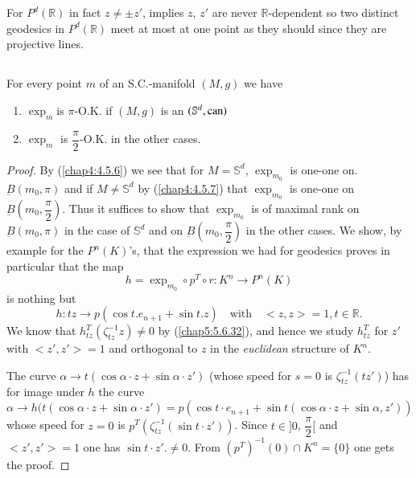 \begin{remark*}
For $P^{d}(\mathbb{R})$ in fact $z\neq \pm z'$, implies $z$, $z'$ are
never $\mathbb{R}$-dependent so two distinct geodesics in
$P^{d}(\mathbb{R})$ meet at most at one point as they should since
they are projective lines.
\end{remark*}

\setcounter{subsection}{11}
\subsection{}\label{chap4:4.5.12}

\begin{prop*}
For every point $m$ of an S.C.-manifold $(M,g)$ we have
\begin{enumerate}
\renewcommand{\labelenumi}{\theenumi)}
\item $\exp_{m}$\pageoriginale is $\pi$-O.K. if $(M,g)$ is an
  $(\mathbb{S}^{d},\operatorname{can})$

\item $\exp_{m}$ is $\dfrac{\pi}{2}$-O.K. in the other cases.
\end{enumerate}
\end{prop*}

\begin{proof}
By (\ref{chap4:4.5.6}) we see that for $M=\mathbb{S}^{d}$, $\exp_{m_{0}}$
is one-one on. $\underbar{B}(m_{0},\pi)$ and if $M\neq \mathbb{S}^{d}$
by (\ref{chap4:4.5.7}) that $\exp_{m_{0}}$ is one-one on
$\underbar{B}(m_{0},\dfrac{\pi}{2})$. Thus it suffices to show that
$\exp_{m_{0}}$ is of maximal rank on $\underbar{B}(m_{0},\pi)$ in the
case of $\mathbb{S}^{d}$ and on $\underbar{B}(m_{0},\dfrac{\pi}{2})$
in the other cases. We show, by example for the $P^{n}(K)$'s, that the
  expression we had for geodesics proves in particular that the map
$$
h=\exp_{m_{0}}\circ p^{T}\circ r:K^{n}\to P^{n}(K)
$$
is nothing but
\begin{equation*}
h:tz\to p(\cos t.e_{n+1}+\sin t.z)\quad\text{with}\quad <z,z>=1,
t\in\mathbb{R}.\tag{4.5.13}\label{chap4:4.5.13} 
\end{equation*}
We know that $h^{T}_{tz}(\zeta^{-1}_{tz}z)\neq 0$ by (\ref{chap5:5.6.32}),
and hence we study $h^{T}_{tz}$ for $z'$ with $<z',z'>=1$ and
orthogonal to $z$ in the {\em euclidean} structure of $K^{n}$.

The curve $\alpha\to t(\cos\alpha\cdot z+\sin\alpha\cdot z')$ (whose
speed for $s=0$ is $\zeta^{-1}_{tz}(tz')$) has for image under $h$ the
curve
$$
\alpha\to h(t(\cos \alpha\cdot z+\sin\alpha\cdot z')=p(\cos t\cdot
e_{n+1}+\sin t(\cos \alpha\cdot z+\sin \alpha,z')) 
$$
whose speed for $z=0$ is $p^{T}(\zeta^{-1}_{tz}(\sin t\cdot
z'))$. Since $t\in ]0$, $\dfrac{\pi}{2}[$ and $<z',z'>=1$ one has
  $\sin t\cdot z'.\neq 0$. From $(p^{T})^{-1}(0)\cap K^{n}=\{0\}$ one
  gets the proof.
\end{proof}


